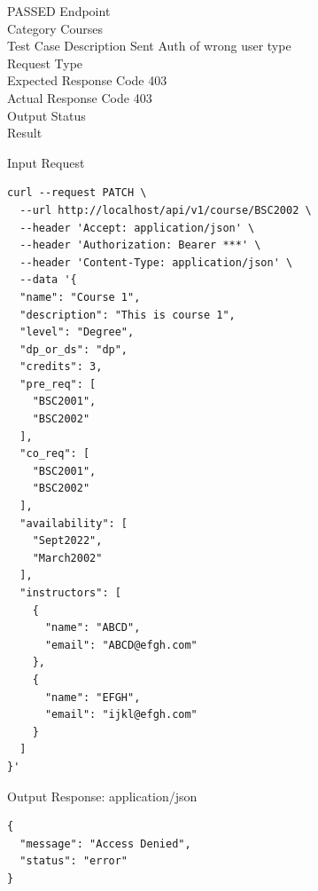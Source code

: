 \begin{testcase}{67}{PASSED}
Endpoint \hfill {}\\
Category \hfill Courses\\
Test Case Description \hfill Sent Auth of wrong user type\\

Request Type    \hfill {}\\
Expected Response Code    \hfill 403\\
Actual Response Code    \hfill 403\\

Output Status \hfill {}\\
Result \hfill {}

\begin{ipblock}{Input Request}
\begin{verbatim}
curl --request PATCH \
  --url http://localhost/api/v1/course/BSC2002 \
  --header 'Accept: application/json' \
  --header 'Authorization: Bearer ***' \
  --header 'Content-Type: application/json' \
  --data '{
  "name": "Course 1",
  "description": "This is course 1",
  "level": "Degree",
  "dp_or_ds": "dp",
  "credits": 3,
  "pre_req": [
    "BSC2001",
    "BSC2002"
  ],
  "co_req": [
    "BSC2001",
    "BSC2002"
  ],
  "availability": [
    "Sept2022",
    "March2002"
  ],
  "instructors": [
    {
      "name": "ABCD",
      "email": "ABCD@efgh.com"
    },
    {
      "name": "EFGH",
      "email": "ijkl@efgh.com"
    }
  ]
}'
\end{verbatim}
\end{ipblock}

\begin{opblock}{Output Response: application/json}
\begin{verbatim}
{
  "message": "Access Denied",
  "status": "error"
}
\end{verbatim}
\end{opblock}
\end{testcase}

